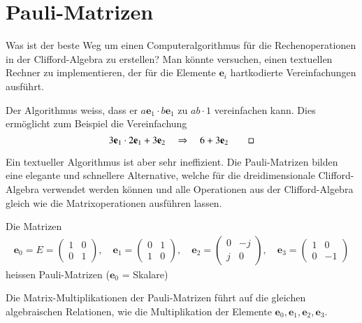%
%
%
\section{Pauli-Matrizen}
%

Was ist der beste Weg um einen Computeralgorithmus für die Rechenoperationen in der Clifford-Algebra zu erstellen?
Man könnte versuchen, einen textuellen Rechner zu implementieren, der für die Elemente $\mathbf{e}_i$ hartkodierte Vereinfachungen ausführt.
\begin{beispiel}
	Der Algorithmus weiss, dass er $a\mathbf{e}_1\cdot b\mathbf{e}_1$ zu $ab\cdot1$ vereinfachen kann. Dies ermöglicht zum Beispiel die Vereinfachung
	\begin{equation*}
	3\mathbf{e}_1 \cdot 2\mathbf{e}_1 + 3\mathbf{e}_2 \quad\Rightarrow\quad 6 + 3\mathbf{e}_2
\qedhere
	\end{equation*}
\end{beispiel}
Ein textueller Algorithmus ist aber sehr ineffizient.
Die Pauli-Matrizen bilden eine elegante und schnellere Alternative, welche für die dreidimensionale Clifford-Algebra verwendet werden können und alle Operationen aus der Clifford-Algebra gleich wie die Matrixoperationen ausführen lassen.
\begin{definition} \label{def:defPauli} 
	Die Matrizen
	\begin{align} \label{Pauli}
	\mathbf{e}_0 = E = 
	\begin{pmatrix}
	1 & 0 \\
	0 & 1
	\end{pmatrix},\quad
	\mathbf{e}_1 =
	\begin{pmatrix}
	0 & 1 \\
	1 & 0
	\end{pmatrix},\quad
	\mathbf{e}_2 =
	\begin{pmatrix}
	0 & -j \\
	j & 0
	\end{pmatrix},\quad
	\mathbf{e}_3 =
	\begin{pmatrix}
	1 & 0 \\
	0 & -1
	\end{pmatrix}	
	\end{align}
	heissen Pauli-Matrizen ($\mathbf{e}_0$ = Skalare)
\end{definition}
Die Matrix-Multiplikationen der Pauli-Matrizen führt auf die gleichen algebraischen Relationen, wie die Multiplikation der Elemente $\mathbf{e}_0, \mathbf{e}_1, \mathbf{e}_2, \mathbf{e}_3$.
